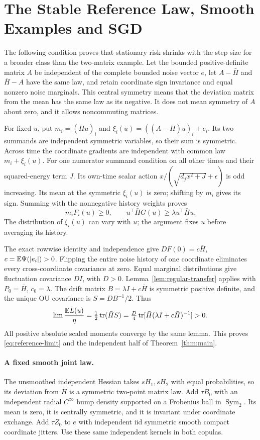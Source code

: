 \section{The Stable Reference Law, Smooth Examples and SGD}
\label{app:reference}

The following condition proves that stationary risk shrinks with the
step size for a broader class than the two-matrix example. Let the bounded positive-definite matrix $A$ be
independent of the complete bounded noise vector $e$, let
$A-\bar H$ and $\bar H-A$ have the same law, and retain coordinate sign
invariance and equal nonzero noise marginals. This central symmetry means that the deviation matrix from the mean
has the same law as its negative. It does not mean symmetry of $A$ about
zero, and it allows noncommuting matrices.

For fixed $u$, put $m_i=(\bar H u)_i$ and
$\xi_i(u)=((A-\bar H)u)_i+e_i$. Its two summands are independent symmetric variables, so their sum is
symmetric. Across time the coordinate gradients are independent with
common law $m_i+\xi_i(u)$. For one numerator summand condition on all
other times and their squared-energy term $J$. Its own-time scalar action
$x/(\sqrt{d_jx^2+J}+\epsilon)$ is odd increasing. Its mean at the
symmetric $\xi_i(u)$ is zero; shifting by $m_i$ gives its sign.
Summing with the nonnegative history weights proves
\[
 m_iF_i(u)\geq0,\qquad
 u^\top\bar H G(u)\geq\lambda u^\top\bar H u.
\]
The distribution of $\xi_i(u)$ can vary with $u$; the argument fixes $u$
before averaging its history.

The exact rowwise identity and independence give $DF(0)=c\bar H$,
$c=\mathbb E\Psi(|e_i|)>0$. Flipping the entire noise history of one coordinate eliminates every
cross-coordinate covariance at zero. Equal marginal distributions give
fluctuation covariance $DI$, with $D>0$. Lemma~\ref{lem:regular-transfer} applies with
$P_0=\bar H$, $c_0=\lambda$. The drift matrix
$B=\lambda I+c\bar H$ is symmetric positive definite, and the unique
OU covariance is $S=D B^{-1}/2$. Thus
\[
 \lim\frac{\mathbb E L(u)}\eta
 =\tfrac12\operatorname{tr}(\bar H S)
 =\tfrac D4\operatorname{tr}[\bar H(\lambda I+c\bar H)^{-1}]>0.
\]
All positive absolute scaled moments converge by the same lemma. This
proves \eqref{eq:reference-limit} and the independent half of
Theorem~\ref{thm:main}.

\paragraph{A fixed smooth joint law.}
The unsmoothed independent Hessian takes $sH_1,sH_2$ with equal probabilities,
so its deviation from $\bar H$ is a symmetric two-point matrix law. Add
$\tau B_0$ with an independent radial $C^\infty$ bump density supported
on a Frobenius ball in $\operatorname{Sym}_2$. Its mean is zero, it is
centrally symmetric, and it is invariant under coordinate exchange. Add
$\tau Z_0$ to $e$ with independent iid symmetric smooth compact coordinate
jitters. Use these same independent kernels in both copulas.

